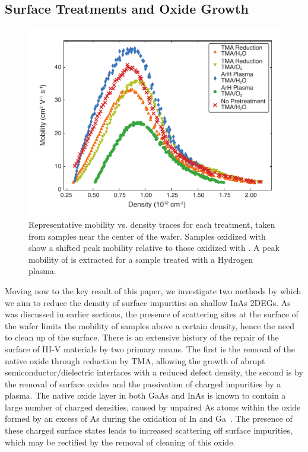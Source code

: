 \subsection{\label{sec:surf_treat}Surface Treatments and Oxide Growth}

\begin{figure}
    \includegraphics[width=0.6\linewidth]{Figure2}
    \caption[Representative mobility and density traces]{\label{fig:surf_fig2} Representative mobility vs. density traces for each treatment, taken from samples near the center of the wafer. Samples oxidized with  show a shifted peak mobility relative to those oxidized with . A peak mobility of  is extracted for a sample treated with a Hydrogen plasma.}
\end{figure}

Moving now to the key result of this paper, we investigate two methods by which we aim to reduce the density of surface impurities on shallow InAs 2DEGs. As was discussed in earlier sections, the presence of scattering sites at the surface of the wafer limits the mobility of samples above a certain density, hence the need to clean up of the surface. There is an extensive history of the repair of the surface of III-V materials by two primary means. The first is the removal of the native oxide through reduction by TMA, allowing the growth of abrupt semiconductor/dielectric interfaces with a reduced defect density\cite{doi:10.1063/1.3148723,Tallarida_2012,CLEVELAND2013167}, the second is by the removal of surface oxides and the passivation of charged impurities by a  plasma\cite{CLEVELAND2013167,BELL1998125,doi:10.1116/1.586538}. The native oxide layer in both GaAs and InAs is known to contain a large number of charged densities\cite{doi:10.1063/1.5054292,PhysRevB.49.11159}, caused by unpaired As atoms within the oxide formed by an excess of As during the oxidation of In and Ga~\cite{doi:10.1063/1.3369540,Affentauschegg_2001}. The presence of these charged surface states leads to increased scattering off surface impurities, which may be rectified by the removal of cleaning of this oxide.

